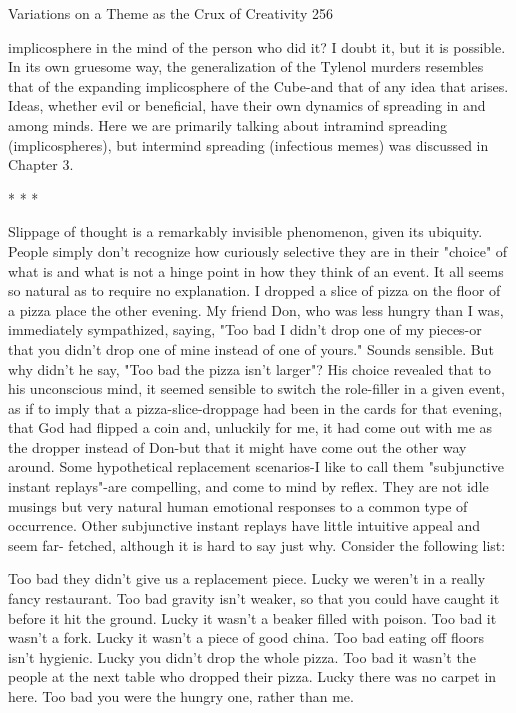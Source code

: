 Variations on a Theme as the Crux of Creativity                                        256

implicosphere in the mind of the person who did it? I doubt it, but it is possible.
       In its own gruesome way, the generalization of the Tylenol murders resembles
that of the expanding implicosphere of the Cube-and that of any idea that arises.
Ideas, whether evil or beneficial, have their own dynamics of spreading in and among
minds. Here we are primarily talking about intramind spreading (implicospheres), but
intermind spreading (infectious memes) was discussed in Chapter 3.

                                       *   *   *

         Slippage of thought is a remarkably invisible phenomenon, given its ubiquity.
People simply don't recognize how curiously selective they are in their "choice" of
what is and what is not a hinge point in how they think of an event. It all seems so
natural as to require no explanation.
         I dropped a slice of pizza on the floor of a pizza place the other evening. My
friend Don, who was less hungry than I was, immediately sympathized, saying, "Too
bad I didn't drop one of my pieces-or that you didn't drop one of mine instead of one
of yours." Sounds sensible. But why didn't he say, "Too bad the pizza isn't larger"?
His choice revealed that to his unconscious mind, it seemed sensible to switch the
role-filler in a given event, as if to imply that a pizza-slice-droppage had been in the
cards for that evening, that God had flipped a coin and, unluckily for me, it had come
out with me as the dropper instead of Don-but that it might have come out the other
way around.
         Some hypothetical replacement scenarios-I like to call them "subjunctive
instant replays"-are compelling, and come to mind by reflex. They are not idle
musings but very natural human emotional responses to a common type of
occurrence. Other subjunctive instant replays have little intuitive appeal and seem far-
fetched, although it is hard to say just why. Consider the following list:

       Too bad they didn't give us a replacement piece.
       Lucky we weren't in a really fancy restaurant.
       Too bad gravity isn't weaker, so that you could have caught it before it hit the
       ground.
       Lucky it wasn't a beaker filled with poison. Too bad it wasn't a fork. Lucky it
       wasn't a piece of good china. Too bad eating off floors isn't hygienic. Lucky
       you didn't drop the whole pizza.
       Too bad it wasn't the people at the next table who dropped their pizza. Lucky
       there was no carpet in here. Too bad you were the hungry one, rather than me.




